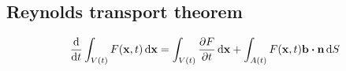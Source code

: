 
\subsection{Reynolds transport theorem}

\begin{equation}
	\frac{\dd}{\dd{t}} \int_{V(t)} F(\vb{x}, t) \dd{\vb{x}} = 
	\int_{V(t)} \pdv{F}{t} (\vb{x}, t) \dd{\vb{x}} + 
	\int_{A(t)} F(\vb{x}, t) \vb{b} \vdot \vb{n} \dd{S}
\end{equation}



